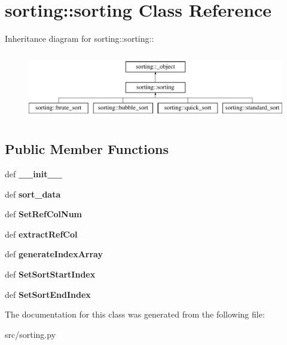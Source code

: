 \hypertarget{classsorting_1_1sorting}{
\section{sorting::sorting Class Reference}
\label{d8/d91/classsorting_1_1sorting}
}
Inheritance diagram for sorting::sorting::\begin{figure}[H]
\begin{center}
\leavevmode
\includegraphics[height=2.97872cm]{d8/d91/classsorting_1_1sorting}
\end{center}
\end{figure}
\subsection*{Public Member Functions}
\begin{DoxyCompactItemize}
\item 
\hypertarget{classsorting_1_1sorting_a487be5019cf669d6d4930ad1a7b4d31e}{
def {\bfseries \_\-\_\-init\_\-\_\-}}
\label{d8/d91/classsorting_1_1sorting_a487be5019cf669d6d4930ad1a7b4d31e}

\item 
\hypertarget{classsorting_1_1sorting_a2c7684816ed4940fb02326561d442cb1}{
def {\bfseries sort\_\-data}}
\label{d8/d91/classsorting_1_1sorting_a2c7684816ed4940fb02326561d442cb1}

\item 
\hypertarget{classsorting_1_1sorting_a4cafa3bef073b1b54155bda4e1f8e216}{
def {\bfseries SetRefColNum}}
\label{d8/d91/classsorting_1_1sorting_a4cafa3bef073b1b54155bda4e1f8e216}

\item 
\hypertarget{classsorting_1_1sorting_a48cde3c7ed40c44042ac05d06a07cafa}{
def {\bfseries extractRefCol}}
\label{d8/d91/classsorting_1_1sorting_a48cde3c7ed40c44042ac05d06a07cafa}

\item 
\hypertarget{classsorting_1_1sorting_a262979d921eececbffe5b6ceec52bcfa}{
def {\bfseries generateIndexArray}}
\label{d8/d91/classsorting_1_1sorting_a262979d921eececbffe5b6ceec52bcfa}

\item 
\hypertarget{classsorting_1_1sorting_a35d67be236898d3455c7eef2b31869b6}{
def {\bfseries SetSortStartIndex}}
\label{d8/d91/classsorting_1_1sorting_a35d67be236898d3455c7eef2b31869b6}

\item 
\hypertarget{classsorting_1_1sorting_a0bf0559b08d7c119cc7122cbd69d3036}{
def {\bfseries SetSortEndIndex}}
\label{d8/d91/classsorting_1_1sorting_a0bf0559b08d7c119cc7122cbd69d3036}

\end{DoxyCompactItemize}


The documentation for this class was generated from the following file:\begin{DoxyCompactItemize}
\item 
src/sorting.py\end{DoxyCompactItemize}
